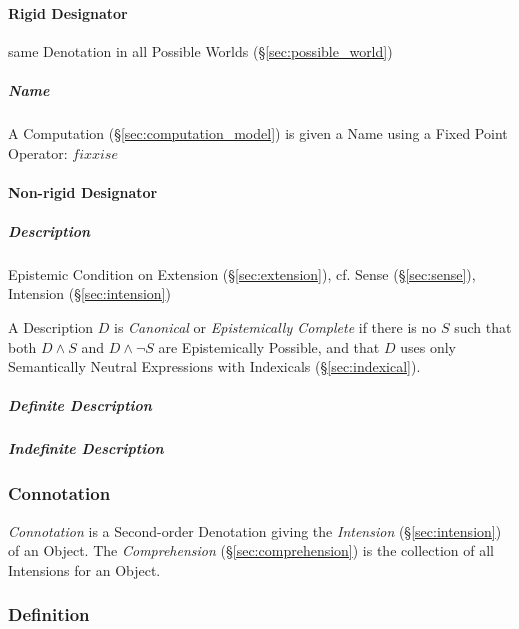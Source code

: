 \paragraph{Rigid Designator}\label{sec:rigid_designator}\hfill

same Denotation in all Possible Worlds (\S\ref{sec:possible_world})

\subparagraph{Name}\label{sec:name}\hfill

A Computation (\S\ref{sec:computation_model}) is given a Name using a
Fixed Point Operator: $fix x is e$



\paragraph{Non-rigid Designator}\label{sec:nonrigid_designator}\hfill

\subparagraph{Description}\label{sec:description}\hfill
\cite{chalmers02}

Epistemic Condition on Extension (\S\ref{sec:extension}), cf. Sense
(\S\ref{sec:sense}), Intension (\S\ref{sec:intension})

A Description $D$ is \emph{Canonical} or \emph{Epistemically Complete}
if there is no $S$ such that both $D \wedge S$ and $D \wedge \neg S$
are Epistemically Possible, and that $D$ uses only Semantically
Neutral Expressions with Indexicals (\S\ref{sec:indexical}).

\subparagraph{Definite Description}\label{sec:definite_description}\hfill

\subparagraph{Indefinite Description}\label{sec:indefinite_description}\hfill



\subsubsection{Connotation}\label{sec:connotation}

\emph{Connotation} is a Second-order Denotation giving the
\emph{Intension} (\S\ref{sec:intension}) of an Object. The
\emph{Comprehension} (\S\ref{sec:comprehension}) is the collection of
all Intensions for an Object.



\subsubsection{Definition}\label{sec:definition}

